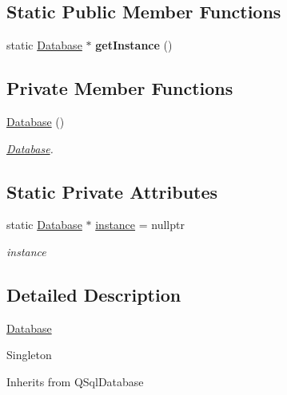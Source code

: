 \subsection*{Static Public Member Functions}
\begin{DoxyCompactItemize}
\item 
\mbox{\label{class_database_a5a3b028f980a577ea0b809eb92312761}} 
static \hyperlink{class_database}{Database} $\ast$ {\bfseries get\+Instance} ()
\end{DoxyCompactItemize}
\subsection*{Private Member Functions}
\begin{DoxyCompactItemize}
\item 
\mbox{\label{class_database_a4703c80e6969d33565ea340f768fdadf}} 
\hyperlink{class_database_a4703c80e6969d33565ea340f768fdadf}{Database} ()
\begin{DoxyCompactList}\small\item\em \hyperlink{class_database}{Database}. \end{DoxyCompactList}\end{DoxyCompactItemize}
\subsection*{Static Private Attributes}
\begin{DoxyCompactItemize}
\item 
\mbox{\label{class_database_a5926460fe1c15c95d470fcde637f8d22}} 
static \hyperlink{class_database}{Database} $\ast$ \hyperlink{class_database_a5926460fe1c15c95d470fcde637f8d22}{instance} = nullptr
\begin{DoxyCompactList}\small\item\em instance \end{DoxyCompactList}\end{DoxyCompactItemize}


\subsection{Detailed Description}
\hyperlink{class_database}{Database}
\begin{DoxyItemize}
\item Singleton
\item Inherits from Q\+Sql\+Database 
\end{DoxyItemize}

